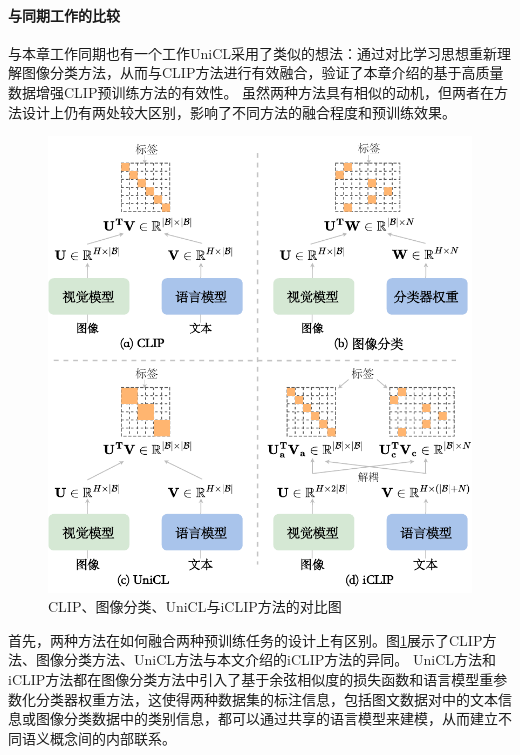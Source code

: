 \paragraph{与同期工作的比较} 
与本章工作同期也有一个工作UniCL\cite{unicl}采用了类似的想法：通过对比学习思想重新理解图像分类方法，从而与CLIP方法进行有效融合，验证了本章介绍的基于高质量数据增强CLIP预训练方法的有效性。
虽然两种方法具有相似的动机，但两者在方法设计上仍有两处较大区别，影响了不同方法的融合程度和预训练效果。

\begin{figure}
  \centering
  \includegraphics[width=0.8\linewidth]{figures/iclip-unicl.pdf}
  \caption{CLIP、图像分类、UniCL与iCLIP方法的对比图}
  \label{fig:iclip-unicl}
\end{figure}


首先，两种方法在如何融合两种预训练任务的设计上有区别。图\ref{fig:iclip-unicl}展示了CLIP方法、图像分类方法、UniCL方法与本文介绍的iCLIP方法的异同。
UniCL方法和iCLIP方法都在图像分类方法中引入了基于余弦相似度的损失函数和语言模型重参数化分类器权重方法，这使得两种数据集的标注信息，包括图文数据对中的文本信息或图像分类数据中的类别信息，都可以通过共享的语言模型来建模，从而建立不同语义概念间的内部联系。

